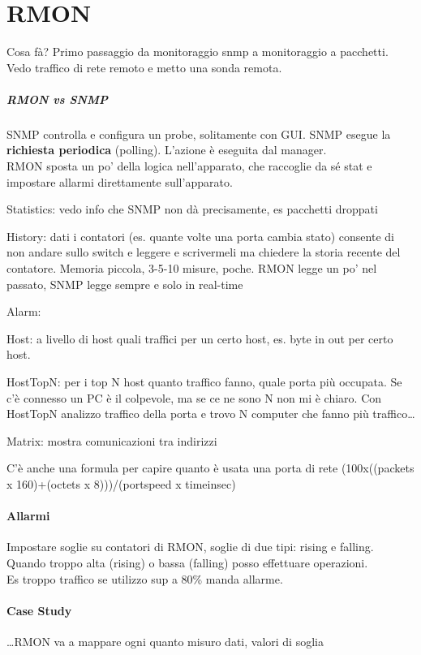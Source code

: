 \documentclass[10pt]{book}
\begin{document}
\section{RMON} Cosa fà? Primo passaggio da monitoraggio snmp a monitoraggio a pacchetti.\\
Vedo traffico di rete remoto e metto una sonda remota.
\subparagraph{RMON vs SNMP} SNMP controlla e configura un probe, solitamente con GUI. SNMP esegue la \textbf{richiesta periodica} (polling). L'azione è eseguita dal manager.\\
RMON sposta un po' della logica nell'apparato, che raccoglie da sé stat e impostare allarmi direttamente sull'apparato.
\begin{list}{}{\textbf{Gruppi RMON}}
	\item Statistics: vedo info che SNMP non dà precisamente, es pacchetti droppati
	\item History: dati i contatori (es. quante volte una porta cambia stato) consente di non andare sullo switch e leggere e scrivermeli ma chiedere la storia recente del contatore. Memoria piccola, 3-5-10 misure, poche. RMON legge un po' nel passato, SNMP legge sempre e solo in real-time
	\item Alarm: 
	\item Host: a livello di host quali traffici per un certo host, es. byte in out per certo host.
	\item HostTopN: per i top N host quanto traffico fanno, quale porta più occupata. Se c'è connesso un PC è il colpevole, ma se ce ne sono N non mi è chiaro. Con HostTopN analizzo traffico della porta e trovo N computer che fanno più traffico\ldots
	\item Matrix: mostra comunicazioni tra indirizzi
\end{list}
C'è anche una formula per capire quanto è usata una porta di rete (100x((packets x 160)+(octets x 8)))/(portspeed x timeinsec)
\paragraph{Allarmi} Impostare soglie su contatori di RMON, soglie di due tipi: rising e falling. Quando troppo alta (rising) o bassa (falling) posso effettuare operazioni.\\
Es troppo traffico se utilizzo sup a 80\% manda allarme.
\paragraph{Case Study} \ldots RMON va a mappare ogni quanto misuro dati, valori di soglia
\end{document}
